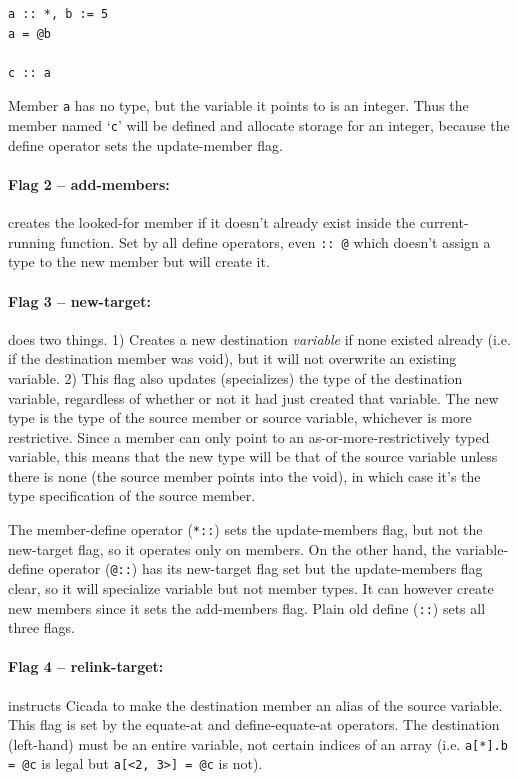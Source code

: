 \documentclass{article}
\newenvironment{code}{
       \begin{list}{}{
               \setlength{\leftmargin}{.4in}
               \setlength{\rightmargin}{0in}
               \setlength{\topsep}{.2in}
       }
       \small
       \item[] }
       { \end{list}   }
\begin{document}
\begin{code} \begin{verbatim}
a :: *, b := 5
a = @b

c :: a
\end{verbatim} \end{code}

\noindent Member \verb#a# has no type, but the variable it points to is an integer.  Thus the member named `\verb#c#' will be defined and allocate storage for an integer, because the define operator sets the update-member flag.\\


\paragraph{Flag 2 -- add-members:}  creates the looked-for member if it doesn't already exist inside the current-running function.  Set by all define operators, even \verb#:: @# which doesn't assign a type to the new member but will create it.\\


\paragraph{Flag 3 -- new-target:}  does two things.  1) Creates a new destination \emph{variable} if none existed already (i.e. if the destination member was void), but it will not overwrite an existing variable.  2) This flag also updates (specializes) the type of the destination variable, regardless of whether or not it had just created that variable.  The new type is the type of the source member or source variable, whichever is more restrictive.  Since a member can only point to an as-or-more-restrictively typed variable, this means that the new type will be that of the source variable unless there is none (the source member points into the void), in which case it's the type specification of the source member.

The member-define operator (\verb#*::#) sets the update-members flag, but not the new-target flag, so it operates only on members.  On the other hand, the variable-define operator (\verb#@::#) has its new-target flag set but the update-members flag clear, so it will specialize variable but not member types.  It can however create new members since it sets the add-members flag.  Plain old define (\verb#::#) sets all three flags.\\


\paragraph{Flag 4 -- relink-target:}  instructs Cicada to make the destination member an alias of the source variable.  This flag is set by the equate-at and define-equate-at operators.  The destination (left-hand) must be an entire variable, not certain indices of an array (i.e. \verb#a[*].b = @c# is legal but \verb#a[<2, 3>] = @c# is not).
\end{document}
